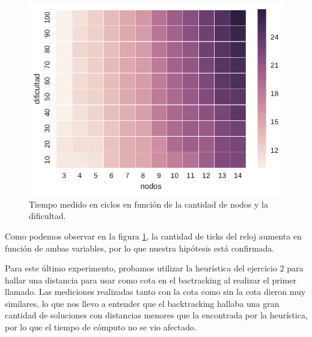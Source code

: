 \begin{figure}[H]
  \begin{center}
    \includegraphics{../experimentacion/ej1/ej1_conHeuristica.pdf}
    \caption{Tiempo medido en ciclos en función de la cantidad de nodos y la dificultad.}
    \label{fig:ej1_conHeuristica}
  \end{center}
\end{figure}

Como podemos observar en la figura \ref{fig:ej1_conHeuristica}, la cantidad de ticks del reloj aumenta en función de ambas variables, por lo que nuestra hipótesis está confirmada.

Para este último experimento, probamos utilizar la heurística del ejercicio 2 para hallar una distancia para usar como cota en el bactracking al realizar el primer llamado. Las mediciones realizadas tanto con la cota como sin la cota dieron muy similares, lo que nos llevo a entender que el backtracking hallaba una gran cantidad de soluciones con distancias menores que la encontrada por la heurística, por lo que el tiempo de cómputo no se vio afectado. 

